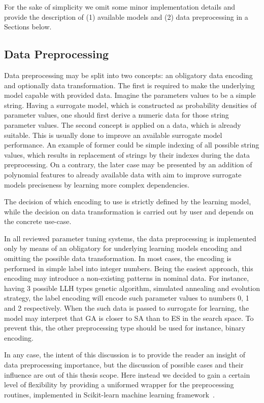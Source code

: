 For the sake of simplicity we omit some minor implementation details and provide the description of (1) available models and (2) data preprocessing in a Sections below.

\subsection{Data Preprocessing}\label{impl: preprocessing}
Data preprocessing may be split into two concepts: an obligatory data encoding and optionally data transformation. The first is required to make the underlying model capable with provided data. Imagine the parameters values to be a simple string. Having a surrogate model, which is constructed as probability densities of parameter values, one should first derive a numeric data for those string parameter values. The second concept is applied on a data, which is already suitable. This is usually done to improve an available surrogate model performance. An example of former could be simple indexing of all possible string values, which results in replacement of strings by their indexes during the data preprocessing. On a contrary, the later case may be presented by an addition of polynomial features to already available data with aim to improve surrogate models preciseness by learning more complex dependencies.

The decision of which encoding to use is strictly defined by the learning model, while the decision on data transformation is carried out by user and depends on the concrete use-case.

In all reviewed parameter tuning systems, the data preprocessing is implemented only by means of an obligatory for underlying learning models encoding and omitting the possible data transformation. In most cases, the encoding is performed in simple label into integer numbers. Being the easiest approach, this encoding may introduce a non-existing patterns in nominal data. For instance, having 3 possible LLH types genetic algorithm, simulated annealing and evolution strategy, the label encoding will encode such parameter values to numbers 0, 1 and 2 respectively. When the such data is passed to surrogate for learning, the model may interpret that GA is closer to SA than to ES in the search space. To prevent this, the other preprocessing type should be used for instance, binary encoding.

In any case, the intent of this discussion is to provide the reader an insight of data preprocessing importance, but the discussion of possible cases and their influence are out of this thesis scope. Here instead we decided to gain a certain level of flexibility by providing a uniformed wrapper for the preprocessing routines, implemented in Scikit-learn machine learning framework~\cite{scikit-learn}.

